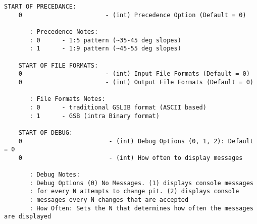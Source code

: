 \begin{framed}
\begin{lstlisting}[style=ccgParameterfile]
    START OF PRECEDANCE:
    0                       - (int) Precedence Option (Default = 0)

       : Precedence Notes:
       : 0      - 1:5 pattern (~35-45 deg slopes)
       : 1      - 1:9 pattern (~45-55 deg slopes)

    START OF FILE FORMATS:
    0                       - (int) Input File Formats (Default = 0)
    0                       - (int) Output File Formats (Default = 0)

       : File Formats Notes:
       : 0      - traditional GSLIB format (ASCII based)
       : 1      - GSB (intra Binary format)

    START OF DEBUG:
    0                        - (int) Debug Options (0, 1, 2): Default = 0
    0                        - (int) How often to display messages

       : Debug Notes:
       : Debug Options (0) No Messages. (1) displays console messages
       : for every N attempts to change pit. (2) displays console
       : messages every N changes that are accepted
       : How Often: Sets the N that determines how often the messages are displayed
    \end{lstlisting}
\end{framed}
